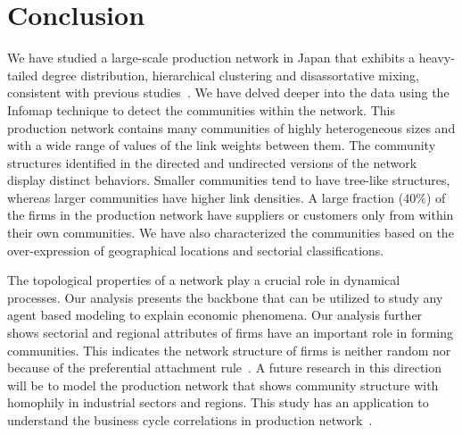 \documentclass[pre,floatfix,twocolumn,showpacs,a4paper,nofootinbib]{revtex4}
\begin{document}
 
\section {Conclusion} 
We have studied a large-scale production network in Japan that exhibits 
a  heavy-tailed degree distribution, hierarchical clustering and disassortative
mixing, consistent with previous studies~\cite{fujiwara2010large, mizuno2014structure}.
We have delved deeper into the data using the Infomap technique to detect the 
communities within the network. This production network
contains many communities of highly heterogeneous sizes and with a wide range of
values of the link weights between them. The community structures identified in the directed and undirected
versions of the network display distinct behaviors. Smaller communities tend to have tree-like structures, whereas larger communities have higher link densities.
A large fraction ($40\%$) of the firms in the production network have suppliers or customers
only from within their own communities. We have also characterized the communities based on the over-expression of geographical locations and sectorial classifications. 

The topological properties of a network play a crucial role in dynamical processes.
Our analysis presents the backbone that can be utilized to study any
agent based modeling to explain economic phenomena. Our analysis 
further shows sectorial and regional attributes of firms have an 
important role in forming communities.  This indicates the network 
structure of firms is neither random nor because of the preferential 
attachment rule~\cite{barabasi1999emergence}. 
A future research in this direction will be to model the production network that shows community structure with homophily in industrial sectors and regions.
This study has an application to understand the business cycle correlations in production network~\cite{krichene2017business}. 
\end{document}

